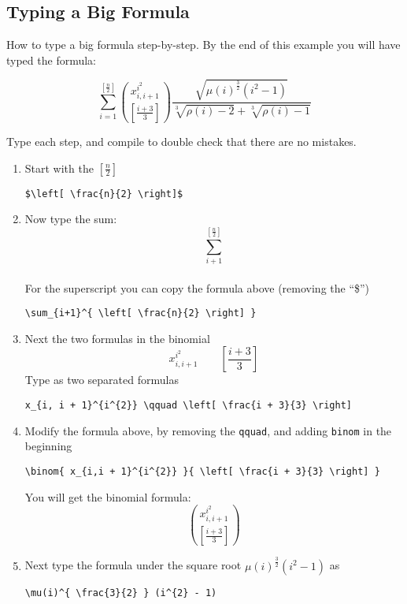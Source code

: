 \subsection{Typing a Big Formula}

How to type a big formula step-by-step. By the end of this example you will have typed the formula:

\[
    \sum_{i = 1}^{ \left[ \frac{n}{2} \right] }
    \binom{ x_{i, i + 1}^{i^{2}} }
        { \left[ \frac{i + 3}{3} \right] }
    \frac{ \sqrt{ \mu(i)^{ \frac{3}{2}} (i^{2} - 1) } }
        { \sqrt[3]{\rho(i) - 2} + \sqrt[3]{\rho(i) - 1} }
\]

Type each step, and compile to double check that there are no mistakes.

\begin{enumerate}
    \item Start with the $\left[ \frac{n}{2} \right]$\\
    \begin{verbatim}
$\left[ \frac{n}{2} \right]$
    \end{verbatim}
    \item Now type the sum:\[
        \sum_{i+1}^{ \left[ \frac{n}{2} \right] }
    \]\\
    For the superscript you can copy the formula above (removing the ``\$'')\\
    \begin{verbatim}
\sum_{i+1}^{ \left[ \frac{n}{2} \right] }
    \end{verbatim}
    \item Next the two formulas in the binomial\[
        x_{i, i + 1}^{i^{2}} \qquad \left[ \frac{i + 3}{3} \right]
    \] Type as two separated formulas
    \begin{verbatim}
x_{i, i + 1}^{i^{2}} \qquad \left[ \frac{i + 3}{3} \right]
    \end{verbatim}
    \item Modify the formula above, by removing the \texttt{qquad}, and adding \texttt{binom} in the beginning
    \begin{verbatim}
\binom{ x_{i,i + 1}^{i^{2}} }{ \left[ \frac{i + 3}{3} \right] }
    \end{verbatim}
    You will get the binomial formula:
    \[
        \binom{ x_{i,i + 1}^{i^{2}} }{ \left[ \frac{i + 3}{3} \right] }
    \]
    \item Next type the formula under the square root $\mu(i)^{ \frac{3}{2} } (i^{2} - 1)$ as
    \begin{verbatim}
\mu(i)^{ \frac{3}{2} } (i^{2} - 1)

\end{verbatim}
\end{enumerate}
